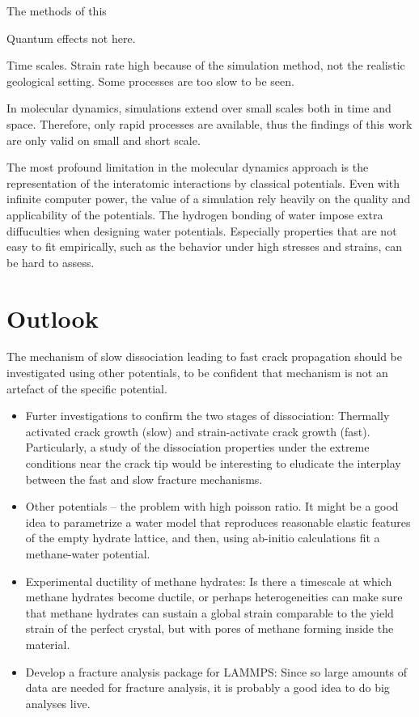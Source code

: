 The methods of this

Quantum effects not here.

Time scales. Strain rate high because of the simulation method, not the realistic geological setting. Some processes are too slow to be seen. 

In molecular dynamics, simulations extend over small scales both in time and space. Therefore, only rapid processes are available, thus the findings of this work are only valid on small and short scale.

The most profound limitation in the molecular dynamics approach is the representation of the interatomic interactions by classical potentials. Even with infinite computer power, the value of a simulation rely heavily on the quality and applicability of the potentials. The hydrogen bonding of water impose extra diffuculties when designing water potentials. Especially properties that are not easy to fit empirically, such as the behavior under high stresses and strains, can be hard to assess.

\section{Outlook}
The mechanism of slow dissociation leading to fast crack propagation should be investigated using other potentials, to be confident that mechanism is not an artefact of the specific potential.

\begin{itemize}
\item Furter investigations to confirm the two stages of dissociation: Thermally activated crack growth (slow) and strain-activate crack growth (fast). Particularly, a study of the dissociation properties under the extreme conditions near the crack tip would be interesting to eludicate the interplay between the fast and slow fracture mechanisms.
\item Other potentials -- the problem with high poisson ratio. It might be a good idea to parametrize a water model that reproduces reasonable elastic features of the empty hydrate lattice, and then, using ab-initio calculations fit a methane-water potential.
\item Experimental ductility of methane hydrates: Is there a timescale at which methane hydrates become ductile, or perhaps heterogeneities can make sure that methane hydrates can sustain a global strain comparable to the yield strain of the perfect crystal, but with pores of methane forming inside the material. 
\item Develop a fracture analysis package for LAMMPS: Since so large amounts of data are needed for fracture analysis, it is probably a good idea to do big analyses live.
\end{itemize}

